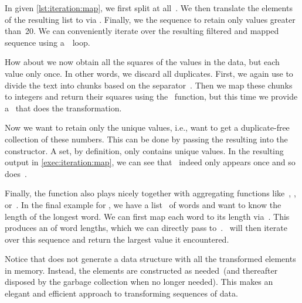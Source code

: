 In  given \cref{lst:iteration:map}, we first split  at all~\pythonil{\",\"}.
We then translate the elements of the resulting list to  via .
Finally, we  the sequence to retain only values greater than~20.
We can conveniently iterate over the resulting filtered and mapped sequence using a~~loop.

How about we now obtain all the squares of the values in the  data, but each value only once.
In other words, we discard all duplicates.
First, we again use  to divide the text into chunks based on the separator~\pythonil{\",\"}.
Then we map these chunks to integers and return their squares using the ~function, but this time we provide a~ that does the transformation.

Now we want to retain only the unique values, i.e., want to get a duplicate-free collection of these numbers.
This can be done by passing the resulting  into the  constructor.
A set, by definition, only contains unique values.
In the resulting output in \cref{exec:iteration:map}, we can see that ~indeed only appears once and so does~.

Finally, the  function also plays nicely together with aggregating functions like~, , or~.
In the final example for , we have a list~ of words and want to know the length of the longest word.
We can first map each word to its length via~.
This produces an  of word lengths, which we can directly pass to~.
~will then iterate over this sequence and return the largest value it encountered.

Notice that  does not generate a data structure with all the transformed elements in memory.
Instead, the elements are constructed as needed~(and thereafter disposed by the garbage collection when no longer needed).
This makes  an elegant and efficient approach to transforming sequences of data.

